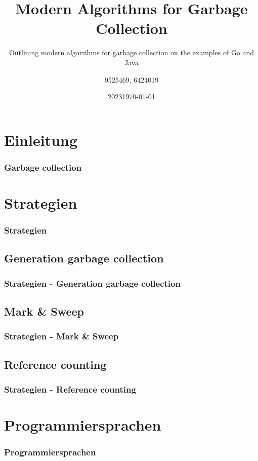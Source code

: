 \documentclass{beamer}
\title{Modern Algorithms for Garbage Collection}
\subtitle{Outlining modern algorithms for garbage collection on the examples of Go and Java}
\date[2023]{2023}
\author{9525469, 6424019}
\institute[DHBW]{DHBW}
\date{\today}
\begin{document}
    
    \frame{\titlepage}

    \tableofcontents
    
	\section{Einleitung}
        \begin{frame}
            \frametitle{Garbage collection}
        \end{frame}

    \section{Strategien}
        \begin{frame}
            \frametitle{Strategien}
        \end{frame}

        \subsection{Generation garbage collection}
            \begin{frame}
                \frametitle{Strategien - Generation garbage collection}
            \end{frame}

        \subsection{Mark \& Sweep}
            \begin{frame}
                \frametitle{Strategien - Mark \& Sweep}
            \end{frame}

        \subsection{Reference counting}
            \begin{frame}
                \frametitle{Strategien - Reference counting}
            \end{frame}

    \section{Programmiersprachen}
        \begin{frame}
            \frametitle{Programmiersprachen}
        \end{frame}
\end{document}
